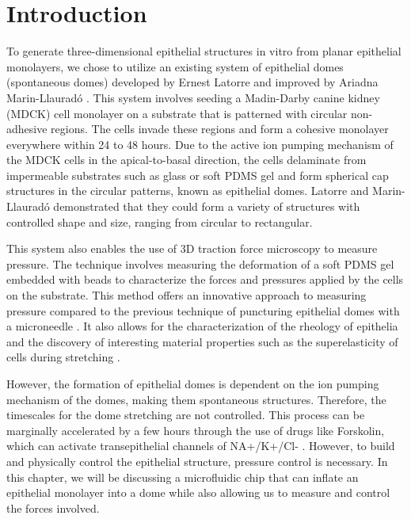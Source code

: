 \hypertarget{introduction}{%
\section{Introduction}\label{introduction1}}

To generate three-dimensional epithelial structures in vitro from planar epithelial monolayers, we chose to utilize an existing system of epithelial domes (spontaneous domes) developed by Ernest Latorre and improved by Ariadna Marin-Llauradó  \cite{latorre2018,marin-llaurado2022}. This system involves seeding a Madin-Darby canine kidney (MDCK) cell monolayer on a substrate that is patterned with circular non-adhesive regions. The cells invade these regions and form a cohesive monolayer everywhere within 24 to 48 hours. Due to the active ion pumping mechanism of the MDCK cells in the apical-to-basal direction, the cells delaminate from impermeable substrates such as glass or soft PDMS gel and form spherical cap structures in the circular patterns, known as epithelial domes. Latorre and Marin-Llauradó demonstrated that they could form a variety of structures with controlled shape and size, ranging from circular to rectangular.  

This system also enables the use of 3D traction force microscopy to measure pressure. The technique involves measuring the deformation of a soft PDMS gel embedded with beads to characterize the forces and pressures applied by the cells on the substrate. This method offers an innovative approach to measuring pressure compared to the previous technique of puncturing epithelial domes with a microneedle \cite{tanner1983, choudhury2022}. It also allows for the characterization of the rheology of epithelia and the discovery of interesting material properties such as the superelasticity of cells during stretching \cite{latorre2018}.  

However, the formation of epithelial domes is dependent on the ion pumping mechanism of the domes, making them spontaneous structures. Therefore, the timescales for the dome stretching are not controlled. This process can be marginally accelerated by a few hours through the use of drugs like Forskolin, which can activate transepithelial channels of NA+/K+/Cl- \cite{klebe1995,bourke1987}. However, to build and physically control the epithelial structure, pressure control is necessary. In this chapter, we will be discussing a microfluidic chip that can inflate an epithelial monolayer into a dome while also allowing us to measure and control the forces involved.


